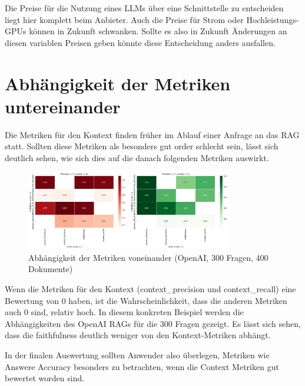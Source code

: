 Die Preise für die Nutzung eines LLMs über eine Schnittstelle zu entscheiden liegt hier komplett beim Anbieter.
Auch die Preise für Strom oder Hochleistungs-GPUs können in Zukunft schwanken.
Sollte es also in Zukunft Änderungen an diesen variablen Preisen geben könnte diese Entscheidung anders ausfallen.

\section{Abhängigkeit der Metriken untereinander}
Die Metriken für den Kontext finden früher im Ablauf einer Anfrage an das RAG statt. Sollten diese Metriken als besonders gut order schlecht sein, lässt sich deutlich sehen, wie sich dies auf die danach folgenden Metriken auswirkt.

\begin{figure}[htbp]
    \centering
    \includegraphics[width=0.8\textwidth]{images/metric_influence_400_300_O_O.png}
    \caption{Abhängigkeit der Metriken voneinander (OpenAI, 300 Fragen, 400 Dokumente)}
    \label{fig:metric_influence}
\end{figure}

Wenn die Metriken für den Kontext (context\_precision und context\_recall) eine Bewertung von 0 haben, ist die Wahrscheinlichkeit, dass die anderen Metriken auch 0 sind, relativ hoch.
In diesem konkreten Beispiel werden die Abhängigkeiten des OpenAI RAGs für die 300 Fragen gezeigt. Es lässt sich sehen, dass die faithfulness deutlich weniger von den Kontext-Metriken abhängt.

In der finalen Auswertung sollten Anwender also überlegen, Metriken wie Answere Accuracy besonders zu betrachten, wenn die Context Metriken gut bewertet worden sind.